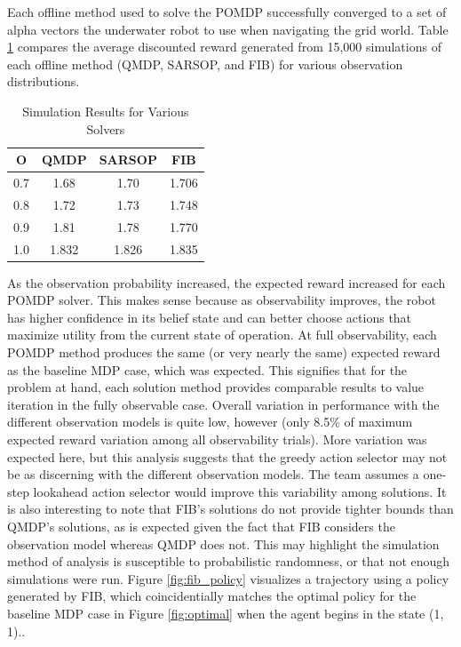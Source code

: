 \documentclass{article}
\begin{document}
Each offline method used to solve the POMDP successfully converged to a set of alpha vectors the underwater robot to use when navigating the grid world. Table \ref{tab:all} compares the average discounted reward generated from 15,000 simulations of each offline method (QMDP, SARSOP, and FIB) for various observation distributions.

\begin{table}[H]
\centering
\caption{Simulation Results for Various Solvers}
\label{tab:all}
\begin{tabular}{|c|c|c|c|}
\hline
O & QMDP & SARSOP & FIB \\ \hline
0.7 & 1.68 & 1.70 & 1.706 \\ \hline
0.8 & 1.72 & 1.73 & 1.748 \\ \hline
0.9 & 1.81 & 1.78 & 1.770 \\ \hline
1.0 & 1.832 & 1.826 & 1.835 \\ \hline
\end{tabular}
\end{table}

As the observation probability increased, the expected reward increased for each POMDP solver.  This makes sense because as observability improves, the robot has higher confidence in its belief state and can better choose actions that maximize utility from the current state of operation. At full observability, each POMDP method produces the same (or very nearly the same) expected reward as the baseline MDP case, which was expected. This signifies that for the problem at hand, each solution method provides comparable results to value iteration in the fully observable case. Overall variation in performance with the different observation models is quite low, however (only 8.5$\%$ of maximum expected reward variation among all observability trials). More variation was expected here, but this analysis suggests that the greedy action selector may not be as discerning with the different observation models. The team assumes a one-step lookahead action selector would improve this variability among solutions. It is also interesting to note that FIB's solutions do not provide tighter bounds than QMDP's solutions, as is expected given the fact that FIB considers the observation model whereas QMDP does not. This may highlight the simulation method of analysis is susceptible to probabilistic randomness, or that not enough simulations were run. Figure \ref{fig:fib_policy} visualizes a trajectory using a policy generated by FIB, which coincidentially matches the optimal policy for the baseline MDP case in Figure \ref{fig:optimal} when the agent begins in the state (1, 1)..
\end{document}
